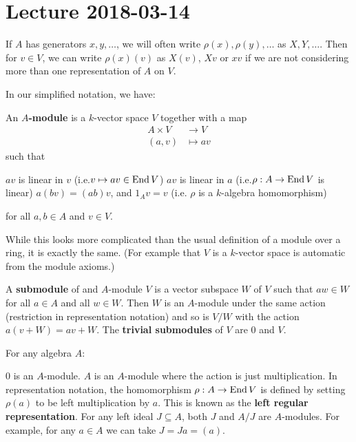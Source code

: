 \section{Lecture 2018-03-14}

\begin{note}
	If $A$ has generators $x,y,\ldots$, we will often write $\rho(x),\rho(y),\ldots$ as $X,Y,\ldots$.
	Then for $v \in V$, we can write $\rho(x)(v)$ as $X(v)$, $Xv$ or $xv$ if we are not considering more than one representation of $A$ on $V$.
\end{note}

In our simplified notation, we have:

\begin{defn}
	An \textbf{$A$-module} is a $k$-vector space $V$ together with a map
	\begin{align*}
		A \times V &\to V \\
		(a,v) &\mapsto av
	\end{align*}
	such that
	\begin{itm}
		\io $av$ is linear in $v$ (i.e.\@ $v \mapsto av \in \operatorname{End} V$)
		\io $av$ is linear in $a$ (i.e.\@ $\rho:A \to \operatorname{End} V$ is linear)
		\io $a(bv)=(ab)v$, and
		\io $1_Av=v$ (i.e. $\rho$ is a $k$-algebra homomorphism)
	\end{itm}
	for all $a,b \in A$ and $v \in V$.
\end{defn}

\begin{rmk}
	While this looks more complicated than the usual definition of a module over a ring, it is exactly the same. (For example that $V$ is a $k$-vector space is automatic from the module axioms.)
\end{rmk}

\begin{defn}
	A \textbf{submodule} of and $A$-module $V$ is a vector subspace $W$ of $V$ such that $aw \in W$ for all $a \in A$ and all $w \in W$.
	Then $W$ is an $A$-module under the same action (restriction in representation notation) and so is $V/W$ with the action $a(v+W)=av+W$.
	The \textbf{trivial submodules} of $V$ are $0$ and $V$.
\end{defn}

\begin{exam}
	For any algebra $A$:
	\begin{itm}
		\io $0$ is an $A$-module.
		\io $A$ is an $A$-module where the action is just multiplication.
		In representation notation, the homomorphism $\rho: A \to \operatorname{End} V$ is defined by setting $\rho(a)$ to be left multiplication by $a$.
		This is known as the \textbf{left regular representation}.
		\io For any left ideal $J \subseteq A$, both $J$ and $A/J$ are $A$-modules.
		For example, for any $a \in A$ we can take $J=Ja=(a)$.
	\end{itm}
\end{exam}

